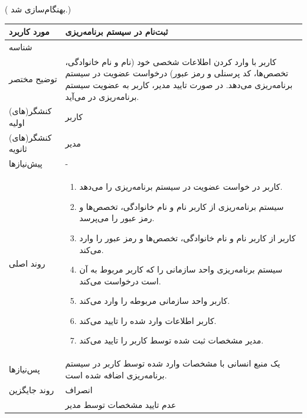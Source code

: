 ({\color{red} بهنگام‌سازی شد.})
\begin{table}[H]
	\centering
	\begin{tabular}{|p{3cm}|p{10cm}|}
		\hline
		مورد کاربرد & ثبت‌نام در سیستم برنامه‌ریزی  \\
		\hline
		شناسه & 
		\stepcounter{usecase_ID}
		\arabic{usecase_ID} \\
		\hline
		توضیح مختصر & کاربر با وارد کردن اطلاعات شخصی خود (نام و نام خانوادگی، تخصص‌ها، کد پرسنلی و رمز عبور) درخواست عضویت در سیستم برنامه‌ریزی می‌دهد. در صورت تایید مدیر، کاربر به عضویت سیستم برنامه‌ریزی در می‌آید. \\
		\hline
		کنشگر(های) اولیه & کاربر \\
		\hline
		کنشگر(های) ثانویه & مدیر \\
		\hline
		پیش‌نیازها & - \\
		\hline
		
		روند اصلی &
		\begin{enumerate}[topsep=0cm,leftmargin=0.5cm]
			\item کاربر در خواست عضویت در سیستم برنامه‌ریزی را می‌دهد.
			\item سیستم برنامه‌ریزی از کاربر نام و نام خانوادگی، تخصص‌ها و رمز عبور را می‌پرسد.
			\item کاربر از کاربر نام و نام خانوادگی، تخصص‌ها و رمز عبور را وارد می‌کند.
			\item سیستم برنامه‌ریزی واحد سازمانی را که کاربر مربوط به آن است درخواست می‌کند.
			\item کاربر واحد سازمانی مربوطه را وارد می‌کند.
			\item کاربر اطلاعات وارد شده را تایید می‌کند.
			\item مدیر مشخصات ثبت شده توسط کاربر را تایید می‌کند.
		\end{enumerate} \\
		
		\hline
		پس‌نیازها & یک منبع انسانی با مشخصات وارد شده توسط کاربر در سیستم برنامه‌ریزی اضافه شده است. \\
		\hline
		روند جایگزین & انصراف \\
		& عدم تایید مشخصات توسط مدیر \\
		\hline
	\end{tabular}
\end{table}


